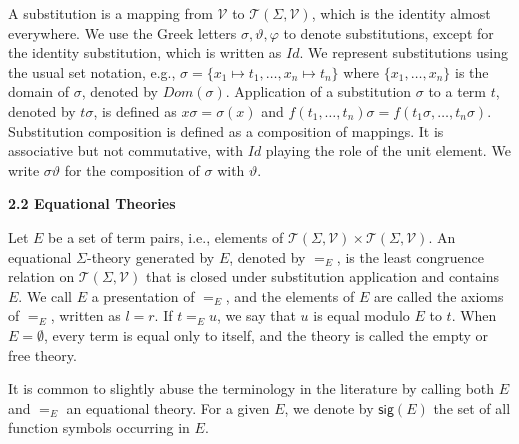  
 
A substitution is a mapping from $\mathcal{V}$ to $\mathcal{T}(\Sigma,\mathcal{V})$, which is the identity almost everywhere. We use the Greek letters $\sigma,\vartheta,\varphi$ to denote substitutions, except for the identity substitution, which is written as $\mathit{Id}$. We represent substitutions using the usual set notation, e.g., $\sigma=\{x_{1}\mapsto t_{1},\dots,x_{n}\mapsto t_{n}\}$ where $\{x_{1},\dots,x_{n}\}$ is the domain of $\sigma$, denoted by $\mathit{Dom}(\sigma)$. Application of a substitution $\sigma$ to a term $t$, denoted by $t\sigma$, is defined as $x\sigma=\sigma(x)$ and $f(t_{1},\ldots,t_{n})\sigma=f(t_{1}\sigma,\ldots,t_{n}\sigma)$. Substitution composition is defined as a composition of mappings. It is associative but not commutative, with $\mathit{Id}$ playing the role of the unit element. We write $\sigma\vartheta$ for the composition of $\sigma$ with $\vartheta$.\par
 
 
 
 
\par\medskip\noindent\textbf{2.2 Equational Theories}\par
 
 
Let $E$ be a set of term pairs, i.e., elements of $\mathcal{T}(\Sigma,\mathcal{V})\times\mathcal{T}(\Sigma,\mathcal{V})$. An equational $\Sigma$-theory generated by $E$, denoted by $=_{E}$, is the least congruence relation on $\mathcal{T}(\Sigma,\mathcal{V})$ that is closed under substitution application and contains $E$. We call $E$ a presentation of $=_{E}$, and the elements of $E$ are called the axioms of $=_{E}$, written as $l=r$. If $t=_{E}u$, we say that $u$ is equal modulo $E$ to $t$. When $E=\emptyset$, every term is equal only to itself, and the theory is called the empty or free theory.\par
 
 
 
It is common to slightly abuse the terminology in the literature by calling both $E$ and $=_{E}$ an equational theory. For a given $E$, we denote by $\mathsf{sig}(E)$ the set of all function symbols occurring in $E$.\par
 
